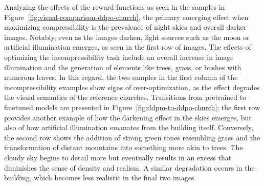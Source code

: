 \noindent Analyzing the effects of the reward functions as seen in the samples in Figure~\ref{fig:visual-comparison-ddpo-church}, the primary emerging effect when maximizing compressibility is the prevalence of night skies and overall darker images. Notably, even as the images darken, light sources such as the moon or artificial illumination emerges, as seen in the first row of images. The effects of optimizing the incompressibility task include an overall increase in image illumination and the generation of elements like trees, grass, or bushes with numerous leaves. In this regard, the two samples in the first column of the incompressibility examples show signs of over-optimization, as the effect degrades the visual semantics of the reference churches. Transitions from pretrained to finetuned models are presented in Figure~\ref{fig:ddpm-to-ddpo-church}; the first row provides another example of how the darkening effect in the skies emerges, but also of how artificial illumination emanates from the building itself. Conversely, the second row shows the addition of strong green tones resembling grass and the transformation of distant mountains into something more akin to trees. The cloudy sky begins to detail more but eventually results in an excess that diminishes the sense of density and realism. A similar degradation occurs in the building, which becomes less realistic in the final two images. \\

